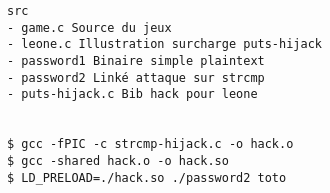 \documentclass[11pt]{article}
\begin{document}
\begin{solution}
\begin{verbatim}
src
- game.c Source du jeux
- leone.c Illustration surcharge puts-hijack
- password1 Binaire simple plaintext
- password2 Linké attaque sur strcmp
- puts-hijack.c Bib hack pour leone


$ gcc -fPIC -c strcmp-hijack.c -o hack.o
$ gcc -shared hack.o -o hack.so
$ LD_PRELOAD=./hack.so ./password2 toto
\end{verbatim}
\end{solution}
\end{document}
